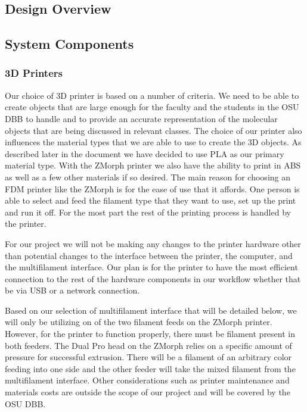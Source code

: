 \documentclass[letterpaper, onecolumn, draftclsnofoot, 10pt, compsoc]{IEEEtran}
\begin{document}
\begin{singlespace}
\section{Design Overview}
    \subsection{System Components}
    	\subsubsection{3D Printers}
        Our choice of 3D printer is based on a number of criteria. We need to be able to create objects that are large enough for the faculty and the students in the OSU DBB to handle and to provide an accurate representation of the molecular objects that are being discussed in relevant classes. The choice of our printer also influences the material types that we are able to use to create the 3D objects. As described later in the document we have decided to use PLA as our primary material type. With the ZMorph printer we also have the ability to print in ABS as well as a few other materials if so desired.  The main reason for choosing an FDM printer like the ZMorph is for the ease of use that it affords. One person is able to select and feed the filament type that they want to use, set up the print and run it off. For the most part the rest of the printing process is handled by the printer.\par
		For our project we will not be making any changes to the printer hardware other than potential changes to the interface between the printer, the computer, and the multifilament interface. Our plan is for the printer to have the most efficient connection to the rest of the hardware components in our workflow whether that be via USB or a network connection.\par
		Based on our selection of multifilament interface that will be detailed below, we will only be utilizing on of the two filament feeds on the ZMorph printer. However, for the printer to function properly, there must be filament present in both feeders. The Dual Pro head on the ZMorph relies on a specific amount of pressure for successful extrusion. There will be a filament of an arbitrary color feeding into one side and the other feeder will take the mixed filament from the multifilament interface. Other considerations such as printer maintenance and materials costs are outside the scope of our project and will be covered by the OSU DBB.\par

\end{singlespace}
\end{document}
